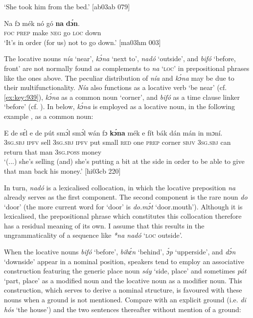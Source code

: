\glt ‘She took him from the bed.’ [ab03ab 079]
\z


\ea%
    \label{ex:key:915}
    \gll Na  fɔ  mék    nó  gó  \textbf{na}  \textbf{dɔ́n}.\\
\textsc{foc}  \textsc{prep}  make  \textsc{neg}  go  \textsc{loc}  down\\

\glt ‘It’s in order (for us) not to go down.’ [ma03hm 003]
\z

The locative nouns \textit{nía} ‘near’, \textit{kɔ́na} ‘next to’, \textit{nadó} ‘outside’, and \textit{bifó} ‘before, front’ are not normally found as complements to \textit{na} ‘\textsc{loc}’ in prepositional phrases like the ones above. The peculiar distribution of \textit{nía} and \textit{kɔ́na} may be due to their multifunctionality. \textit{Nía} also functions as a locative verb ‘be near’ (cf. \ref{ex:key:939}), \textit{kɔ́na} as a common noun ‘corner’, and \textit{bifó} as a time clause linker ‘before’ (cf. ). In  below, \textit{kɔ́na} is employed as a locative noun, in the following example , as a common noun: 


\ea%
    \label{ex:key:916}
    \gll E    de  sɛ́l  e    de  pút  smɔ́l  smɔ́l  wán  fɔ  \textbf{kɔ́na} 
    mék    e    fít  bák    dán  mán    in    mɔní.\\
    \textsc{3sg.sbj}  \textsc{ipfv}  sell  \textsc{3sg.sbj}  \textsc{ipfv}  put  small  \textsc{red}    one  \textsc{prep}  corner
\textsc{sbjv}    \textsc{3sg.sbj}  can  return  that  man    \textsc{3sg.poss}  money\\

\glt ‘(...) she’s selling (and) she’s putting a bit at the side in order to be able to give
that man back his money.’ [hi03cb 220]
\z

In turn, \textit{nadó} is a lexicalised collocation, in which the locative preposition \textit{na} already serves as the first component. The second component is the rare noun \textit{do} ‘door’ (the more current word for ‘door’ is \textit{do.mɔ́t} ‘door.mouth’). Although it is lexicalised, the prepositional phrase which constitutes this collocation therefore has a residual meaning of its own. I assume that this results in the ungrammaticality of a sequence like \textit{*na nadó} ‘\textsc{loc} outside’.


When the locative nouns \textit{bifó} ‘before’, \textit{bihɛ́n} ‘behind’, \textit{ɔ́p} ‘upperside’, and \textit{dɔ́n} ‘downside’ appear in a nominal position, speakers tend to employ an associative construction featuring the generic place noun \textit{sáy} ‘side, place’  and sometimes \textit{pát} ‘part, place’  as a modified noun and the locative noun as a modifier noun. This construction, which serves to derive a nominal structure, is favoured with these nouns when a ground is not mentioned. Compare  with an explicit ground (i.e. \textit{di hós} ‘the house’) and the two sentences thereafter without mention of a ground:



